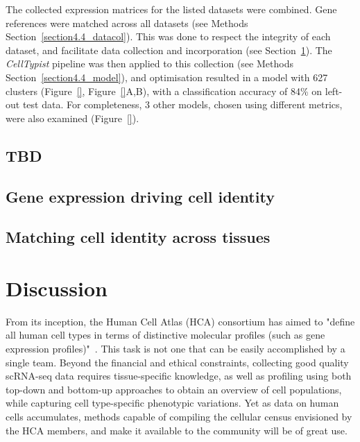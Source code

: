 The collected expression matrices for the listed datasets were combined. Gene references were matched across all datasets (see Methods Section~\ref{section4.4_datacol}). This was done to respect the integrity of each dataset, and facilitate data collection and incorporation (see Section~\ref{section4.3}). The \textit{CellTypist} pipeline was then applied to this collection (see Methods Section~\ref{section4.4_model}), and optimisation resulted in a model with 627 clusters (Figure~\ref{}, Figure~\ref{}A,B), with a classification accuracy of 84\% on left-out test data. For completeness, 3 other models, chosen using different metrics, were also examined (Figure~\ref{}).


\subsection{TBD}
\label{section4.2_test}



\subsection{Gene expression driving cell identity}
\label{section4.2_genes}



\subsection{Matching cell identity across tissues}
\label{section4.2_tissues}



\section{Discussion}
\label{section4.3}
From its inception, the Human Cell Atlas (HCA) consortium has aimed to "define all human cell types in terms of distinctive molecular profiles (such as gene expression profiles)"~\citep{regev_human_2017}. This task is not one that can be easily accomplished by a single team. Beyond the financial and ethical constraints, collecting good quality scRNA-seq data requires tissue-specific knowledge, as well as profiling using both top-down and bottom-up approaches to obtain an overview of cell populations, while capturing cell type-specific phenotypic variations. Yet as data on human cells accumulates, methods capable of compiling the cellular census envisioned by the HCA members, and make it available to the community will be of great use.

